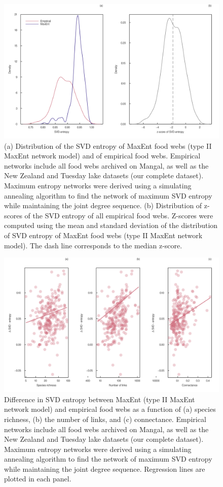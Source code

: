 \documentclass[
  12pt,
]{article}
\begin{document}
\begin{figure}
\hypertarget{fig:entropy_dist}{%
\centering
\includegraphics{figures/entropy_distribution.png}
\caption{(a) Distribution of the SVD entropy of MaxEnt food webs (type
II MaxEnt network model) and of empirical food webs. Empirical networks
include all food webs archived on Mangal, as well as the New Zealand and
Tuesday lake datasets (our complete dataset). Maximum entropy networks
were derived using a simulating annealing algorithm to find the network
of maximum SVD entropy while maintaining the joint degree sequence. (b)
Distribution of z-scores of the SVD entropy of all empirical food webs.
Z-scores were computed using the mean and standard deviation of the
distribution of SVD entropy of MaxEnt food webs (type II MaxEnt network
model). The dash line corresponds to the median
z-score.}\label{fig:entropy_dist}
}
\end{figure}

\begin{figure}
\hypertarget{fig:entropy_size}{%
\centering
\includegraphics{figures/difference_entropy.png}
\caption{Difference in SVD entropy between MaxEnt (type II MaxEnt
network model) and empirical food webs as a function of (a) species
richness, (b) the number of links, and (c) connectance. Empirical
networks include all food webs archived on Mangal, as well as the New
Zealand and Tuesday lake datasets (our complete dataset). Maximum
entropy networks were derived using a simulating annealing algorithm to
find the network of maximum SVD entropy while maintaining the joint
degree sequence. Regression lines are plotted in each
panel.}\label{fig:entropy_size}
}
\end{figure}
\end{document}
